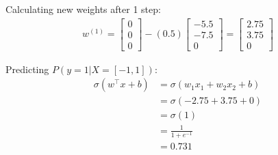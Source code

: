 \documentclass{article}
\begin{document}
Calculating new weights after 1 step:
\begin{equation}
    \begin{split}
        w^{(1)} = 
        \begin{bmatrix}
        0 \\  0  \\ 0         
        \end{bmatrix}
        - (0.5) 
        \begin{bmatrix}
        -5.5 \\  -7.5  \\ 0         
        \end{bmatrix}
        = 
        \begin{bmatrix}
        2.75 \\  3.75  \\ 0         
        \end{bmatrix}
    \end{split}
\end{equation}

Predicting $P(y=1 | X = [-1, 1])$:
\begin{equation}
    \begin{split}
        \sigma(w^{\intercal}x+b) &= \sigma(w_1x_1 + w_2x_2 + b)\\
        &= \sigma(-2.75 + 3.75 + 0) \\
        &= \sigma(1)\\
        &= \frac{1}{1+e^{-1}}\\
        &= 0.731
    \end{split}
\end{equation}
\end{document}
